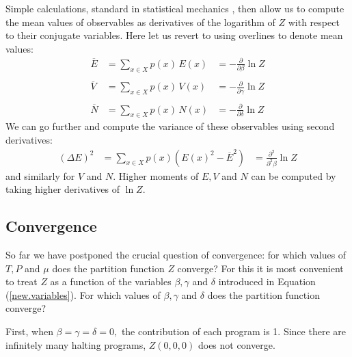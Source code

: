 \documentclass[12pt,twoside,openright]{report}
\begin{document}
Simple calculations, standard in statistical mechanics 
\cite{Reif}, then allow us to compute the mean values of observables as derivatives of the logarithm of $Z$ 
with respect to their conjugate variables.    Here let us revert to using overlines to denote mean values:
\[
\begin{array}{ccc}
   \overline{E} &= 
   \displaystyle{\sum_{x \in X} p(x) \, E(x)} &=
- \displaystyle{\frac{\partial}{\partial \beta} \ln Z}  \\  
\\
   \overline{V} &=
   \displaystyle{\sum_{x \in X} p(x) \, V(x)} &=
- \displaystyle{\frac{\partial}{\partial \gamma} \ln Z}  \\  
\\
   \overline{N} &=
   \displaystyle{\sum_{x \in X} p(x) \, N(x)} &=
- \displaystyle{\frac{\partial}{\partial \delta} \ln Z}  
\end{array}
\]
We can go further and compute the variance of these observables using second derivatives:
\[       
\begin{array}{ccc}
   {(\Delta E)^2} &=
\displaystyle{\sum_{x \in X} p(x) (E(x)^2 - \overline{E}^2)} &=
\displaystyle{ \frac{\partial^2}{\partial^2 \beta} \ln Z } 
\end{array}
\]
and similarly for $V$ and $N$.  Higher moments of $E, V$ and 
$N$ can be computed by taking higher derivatives of $\ln Z$.  

\subsection{Convergence}

So far we have postponed the crucial question of convergence:
for which values of $T,P$ and $\mu$ does the partition function 
$Z$ converge?  For this it is most convenient to treat $Z$ as a function of the variables $\beta, \gamma$ and $\delta$
introduced in Equation (\ref{new.variables}).  For which values of $\beta, \gamma$ and $\delta$ does the partition function converge?   

First, when $\beta = \gamma = \delta = 0,$ the contribution of each program is 1.   Since there are infinitely many halting programs, $Z(0,0,0)$ does not converge.
\end{document}
